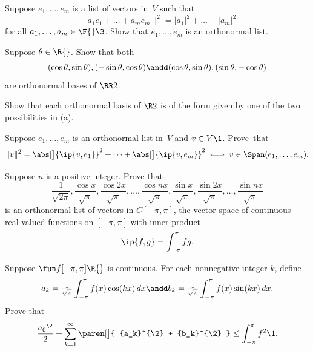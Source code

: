 
\exercise
Suppose $e_1, \dots, e_m$ is a list of vectors in~$V$ such that
\[
\| a_1 e_1 + \dots + a_m e_m \|^2 = | a_1|^2 + \dots + |a_m|^2
\]
for all $a_1, \dots, a_m \in \F{}\3$. Show that $e_1, \dots, e_m$ is an orthonormal list.


\exercise
\begin{SUBtheorem}
\item
Suppose $\theta \in \R{}$. Show that both
\[
(\cos \theta, \sin \theta), (-\sin \theta, \cos \theta) \andd (\cos \theta, \sin \theta), (\sin \theta, -\cos \theta)
\]
are orthonormal bases of $\RR2$.
\item
Show that each orthonormal basis of $\R2$ is of the form given by one of the two possibilities in (a).
\end{SUBtheorem}


\exercise
Suppose $e_1, \dots, e_m$ is an orthonormal list in~$V$ and $v \in V\1$.  Prove~that
\[
\|v\|^2 = \abs[\big]{ \ip{v, e_1} }^2 + \dots + \abs[\big]{ \ip{v, e_m} }^2 \iff v \in \Span(e_1, \dots, e_m).
\]
\exercisedisplayend


\exercise
Suppose $n$ is a positive integer.  Prove that \label{8Fourier}
\[
\frac{1}{\sqrt{2\pi}}, \frac{\cos x}{\sqrt{\pi}}, \frac{\cos 2x}{\sqrt{\pi}}, \dots,
\frac{\cos nx}{\sqrt{\pi}}, \frac{\sin x}{\sqrt{\pi}}, \frac{\sin 2x}{\sqrt{\pi}}, \dots,
\frac{\sin nx}{\sqrt{\pi}}
\]
is an orthonormal list of vectors in $C[-\pi,\pi]$, the vector space of
continuous real-valued functions on $[-\pi,\pi]$ with inner product
\[
\ip{f, g} = \int_{-\pi}^{\pi} fg.
\]


\exercise
Suppose $\fun f {[-\pi, \pi]} {\R{}}$ is continuous. For each nonnegative integer $k$, define
\[
a_k = \tfrac{1}{\sqrt{\pi}} \int_{-\pi}^{\pi} f(x) \cos(kx) \,dx \andd b_k = \tfrac{1}{\sqrt{\pi}}  \int_{-\pi}^{\pi} f(x) \sin(kx) \,dx.
\]
Prove that
\[
\frac{{a_0}^{\2}}{2} + \sum_{k=1}^\infty \paren[\big]{ {a_k}^{\2} + {b_k}^{\2} } \le \int_{-\pi}^{\pi} f^2\1.
\]


